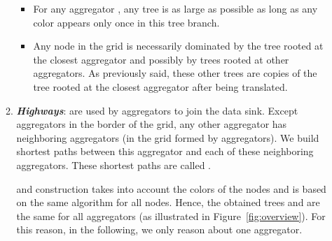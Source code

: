 \begin{enumerate}
\begin{enumerate}
\begin{itemize}
\item For any aggregator , any tree  is as large as possible as long as any color appears only once in this tree branch. 
\item Any node in the grid is necessarily dominated by the tree rooted at the closest aggregator and possibly by trees rooted at other aggregators. As previously said, these other trees are copies of the tree rooted at the closest aggregator after being translated.
\end{itemize}

\item \textbf{\textit{Highways}}: are used by aggregators to join the data sink.
Except aggregators in the border of the grid, any other aggregator has 
 neighboring aggregators (in the grid formed by aggregators). We build  shortest paths between this aggregator and each of these  neighboring aggregators. These shortest paths are called .


\begin{remark}
 and  construction takes into account the colors of the nodes and is based on the same algorithm for all nodes. Hence, the obtained trees and  are the same for all aggregators (as illustrated in Figure~\ref{fig:overview}). For this reason, in the following, we only reason about one aggregator.
\end{remark}


\end{enumerate}
\end{enumerate}
